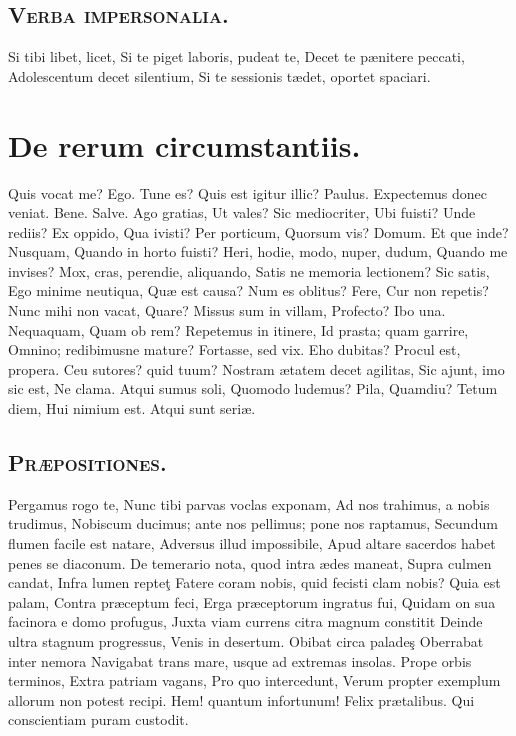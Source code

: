 \documentclass[12pt, twocolumn]{memoir}
\begin{document}
\section*{\textsc{Verba impersonalia.}}

Si tibi libet, licet,
Si te piget laboris, pudeat te,
Decet te pænitere peccati,
Adolescentum decet silentium,
Si te sessionis tædet, oportet spaciari.

\chapter{De rerum circumstantiis.}

Quis vocat me? Ego.
Tune es? Quis est igitur illic? Paulus.
Expectemus donec veniat. Bene.
Salve. Ago gratias,
Ut vales? Sic mediocriter,
Ubi fuisti? Unde rediis? Ex oppido,
Qua ivisti? Per porticum,
Quorsum vis? Domum.
Et que inde? Nusquam,
Quando in horto fuisti?
Heri, hodie, modo, nuper, dudum,
Quando me invises?
Mox, cras, perendie, aliquando,
Satis ne memoria lectionem? Sic satis,
Ego minime neutiqua,
Quæ est causa? Num es oblitus? Fere,
Cur non repetis?
Nunc mihi non vacat,
Quare? Missus sum in villam,
Profecto? Ibo una. Nequaquam,
Quam ob rem? Repetemus in itinere,
Id prasta; quam garrire,
Omnino; redibimusne mature?
Fortasse, sed vix. Eho dubitas?
Procul est, propera.
Ceu sutores? quid tuum?
Nostram ætatem decet agilitas,
Sic ajunt, imo sic est,
Ne clama. Atqui sumus soli,
Quomodo ludemus? Pila,
Quamdiu? Tetum diem,
Hui nimium est. Atqui sunt seriæ.

\section*{\textsc{Præpositiones.}}

Pergamus rogo te,
Nunc tibi parvas voclas exponam,
Ad nos trahimus, a nobis trudimus,
Nobiscum ducimus; ante nos pellimus; pone nos raptamus,
Secundum flumen facile est natare,
Adversus illud impossibile,
Apud altare sacerdos habet penes se diaconum.
De temerario nota, quod intra ædes maneat,
Supra culmen candat,
Infra lumen repteţ
Fatere coram nobis, quid fecisti clam nobis?
Quia est palam,
Contra præceptum feci,
Erga præceptorum ingratus fui,
Quidam on sua facinora e domo profugus,
Juxta viam currens citra magnum constitit
Deinde ultra stagnum progressus,
Venis in desertum.
Obibat circa paladeş
Oberrabat inter nemora
Navigabat trans mare, usque ad extremas insolas.
Prope orbis terminos,
Extra patriam vagans,
Pro quo intercedunt,
Verum propter exemplum allorum non potest recipi.
Hem! quantum infortunum!
Felix prætalibus.
Qui conscientiam puram custodit.
\end{document}
